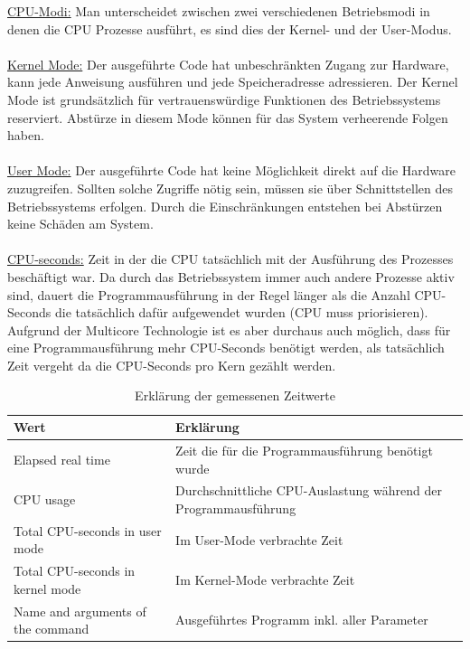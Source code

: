 \documentclass{fancydocument}
\begin{document}
\bigskip
\noindent
\underline{CPU-Modi:} Man unterscheidet zwischen zwei verschiedenen Betriebsmodi in denen die CPU Prozesse ausführt, es sind dies der Kernel- und der User-Modus.
\\\\
\underline{Kernel Mode:} Der ausgeführte Code hat unbeschränkten Zugang zur Hardware, kann jede Anweisung ausführen und jede Speicheradresse adressieren. Der Kernel Mode ist grundsätzlich für vertrauenswürdige Funktionen des Betriebssystems reserviert. Abstürze in diesem Mode können für das System verheerende Folgen haben.
\\\\
\underline{User Mode:} Der ausgeführte Code hat keine Möglichkeit direkt auf die Hardware zuzugreifen. Sollten solche Zugriffe nötig sein, müssen sie über Schnittstellen des Betriebssystems erfolgen. Durch die Einschränkungen entstehen bei Abstürzen keine Schäden am System.
\\\\
\underline{CPU-seconds:} Zeit in der die CPU tatsächlich mit der Ausführung des Prozesses beschäftigt war. Da durch das Betriebssystem immer auch andere Prozesse aktiv sind, dauert die Programmausführung in der Regel länger als die Anzahl CPU-Seconds die tatsächlich dafür aufgewendet wurden (CPU muss priorisieren). Aufgrund der Multicore Technologie ist es aber durchaus auch möglich, dass für eine Programmausführung mehr CPU-Seconds benötigt werden, als tatsächlich Zeit vergeht da die CPU-Seconds pro Kern gezählt werden.
\\
\begin{table}[h!]
\begin{tabular}[c]{|p{4cm}|p{11cm}|} \hline
\textbf{Wert} & \textbf{Erklärung}\\
\hline
Elapsed real time & Zeit die für die Programmausführung benötigt wurde\\
\hline
CPU usage & Durchschnittliche CPU-Auslastung während der Programmausführung\\
\hline
Total CPU-seconds in user mode & Im User-Mode verbrachte Zeit\\
\hline
Total CPU-seconds in kernel mode & Im Kernel-Mode verbrachte Zeit\\
\hline
Name and arguments of the command & Ausgeführtes Programm inkl. aller Parameter\\
\hline
\end{tabular}
\caption{Erklärung der gemessenen Zeitwerte}
\end{table}
\end{document}
